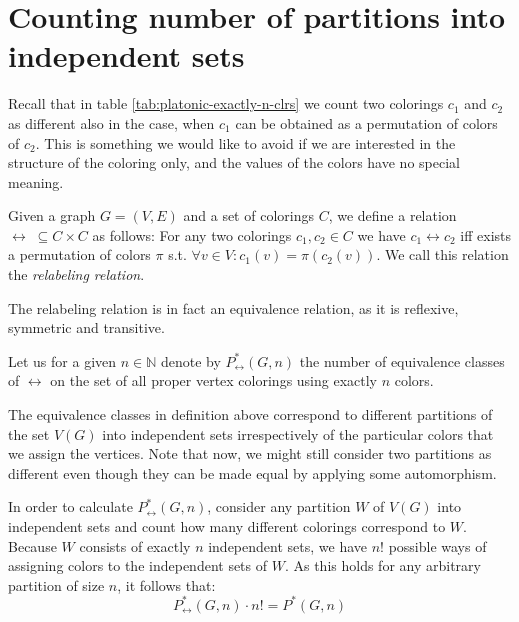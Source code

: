 \chapter{Counting number of partitions into independent sets}
\label{chap:num-partitions-into-indep-sets}

Recall that in table \ref{tab:platonic-exactly-n-clrs} we count two colorings $c_1$ and $c_2$ as different also in the case, when $c_1$ can be obtained as a permutation of colors of $c_2$. This is something we would like to avoid if we are interested in the structure of the coloring only, and the values of the colors have no special meaning.

\begin{defn}\label{dfn:relabeling-relation}
    Given a graph $G=(V,E)$ and a set of colorings $C$, we define a relation $\leftrightarrow \; \subseteq C \times C$ as follows: For any two colorings $c_1,c_2 \in C$ we have $c_1 \leftrightarrow c_2$ iff exists a permutation of colors $\pi$ s.t. $\forall v \in V : c_1(v) = \pi(c_2(v))$. We call this relation the \emph{relabeling relation}.
\end{defn}

The relabeling relation is in fact an equivalence relation, as it is reflexive, symmetric and transitive.

\begin{defn}
    Let us for a given $n \in \mathbb{N}$ denote by $P^*_{\leftrightarrow}(G,n)$ the number of equivalence classes of $\leftrightarrow$ on the set of all proper vertex colorings using exactly $n$ colors. 
\end{defn}

The equivalence classes in definition above correspond to different partitions of the set $V(G)$ into independent sets irrespectively of the particular colors that we assign the vertices. Note that now, we might still consider two partitions as different even though they can be made equal by applying some automorphism. 

In order to calculate $P^*_{\leftrightarrow}(G,n)$, consider any partition $W$ of $V(G)$ into independent sets and count how many different colorings correspond to $W$. Because $W$ consists of exactly $n$ independent sets, we have $n!$ possible ways of assigning colors to the independent sets of $W$. As this holds for any arbitrary partition of size $n$, it follows that:
\begin{equation}\label{eqn:count-relabel-orbits}
    P^*_{\leftrightarrow}(G,n) \cdot n! = P^*(G,n)
\end{equation}

